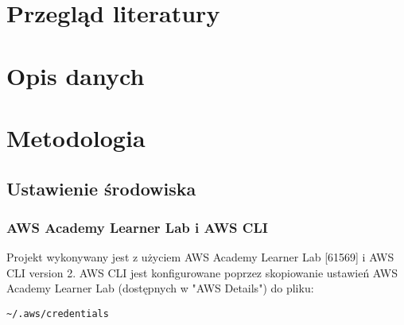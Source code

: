 \documentclass[12pt, a4paper]{article}
\begin{document}
\subsection{}


\section{Przegląd literatury}

\section{Opis danych}

\section{Metodologia}

\subsection{Ustawienie środowiska}
\subsubsection{AWS Academy Learner Lab i AWS CLI}
Projekt wykonywany jest z użyciem AWS Academy Learner Lab [61569] i AWS CLI version 2. AWS CLI jest konfigurowane poprzez skopiowanie ustawień AWS Academy Learner Lab (dostępnych w "AWS Details") do  pliku:
\begin{verbatim}
~/.aws/credentials
\end{verbatim}
\end{document}
